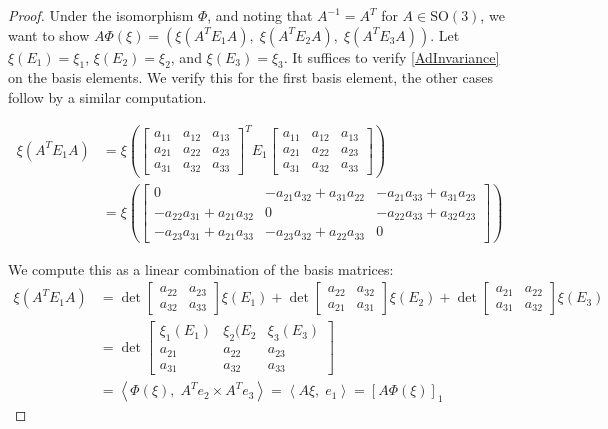 \begin{proof}
Under the isomorphism $\Phi$, and noting that $A^{-1} = A^{T}$ for $A \in \mathrm{SO}(3)$, we want to show \label{AdInvariance} $A \Phi(\xi) = \left( \xi(A^{T} E_{1} A),\; \xi(A^{T} E_{2} A),\; \xi(A^{T} E_{3} A) \right)$. Let $\xi(E_1) = \xi_1$, $\xi(E_2) = \xi_2$, and $\xi(E_3) = \xi_3$. It suffices to verify \eqref{AdInvariance} on the basis elements. We verify this for the first basis element, the other cases follow by a similar computation. 

\begin{align}
\xi \left( A^{T} E_{1} A \right) &= \xi\left(
\begin{bmatrix}
a_{11} & a_{12} & a_{13} \\
a_{21} & a_{22} & a_{23} \\
a_{31} & a_{32} & a_{33}
\end{bmatrix}^{\!\!\!T}
E_{1}
\begin{bmatrix}
a_{11} & a_{12} & a_{13} \\
a_{21} & a_{22} & a_{23} \\
a_{31} & a_{32} & a_{33}
\end{bmatrix}
\right) \\[1em]
&= \xi\left(
\begin{bmatrix}
0 & -a_{21} a_{32} + a_{31} a_{22} & -a_{21} a_{33} + a_{31} a_{23} \\
-a_{22} a_{31} + a_{21} a_{32} & 0 & -a_{22} a_{33} + a_{32} a_{23} \\
-a_{23} a_{31} + a_{21} a_{33} & -a_{23} a_{32} + a_{22} a_{33} & 0
\end{bmatrix}
\right)
\end{align}

\noindent We compute this as a linear combination of the basis matrices:
\begin{align}
\xi(A^{T} E_{1} A) &= 
\det\begin{bmatrix}
a_{22} & a_{23} \\
a_{32} & a_{33}
\end{bmatrix} \xi(E_{1}) +
\det\begin{bmatrix}
a_{22} & a_{32} \\
a_{21} & a_{31}
\end{bmatrix} \xi(E_{2}) +
\det\begin{bmatrix}
a_{21} & a_{22} \\
a_{31} & a_{32}
\end{bmatrix} \xi(E_{3}) \\[0.5em]
&= \det
\begin{bmatrix}
\xi_1(E_{1}) & \xi_2(E_{2} & \xi_3(E_{3}) \\
a_{21} & a_{22} & a_{23} \\
a_{31} & a_{32} & a_{33}
\end{bmatrix} \\[0.5em]
&= \left\langle \Phi(\xi),\; A^{T} e_2 \times A^{T} e_3 \right\rangle 
= \left\langle A \xi,\; e_1 \right\rangle 
= \left[ A \Phi(\xi) \right]_1
\end{align}


\end{proof}
